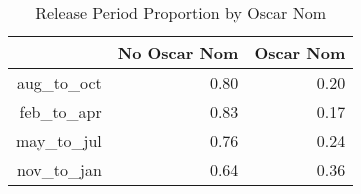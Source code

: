 \begin{table}[H]
\centering
\begin{tabular}{rrr}
  \hline
 & No Oscar Nom & Oscar Nom \\ 
  \hline
aug\_to\_oct & 0.80 & 0.20 \\ 
  feb\_to\_apr & 0.83 & 0.17 \\ 
  may\_to\_jul & 0.76 & 0.24 \\ 
  nov\_to\_jan & 0.64 & 0.36 \\ 
   \hline
\end{tabular}
\caption{Release Period Proportion by Oscar Nom} 
\label{tab:rpon}
\end{table}

